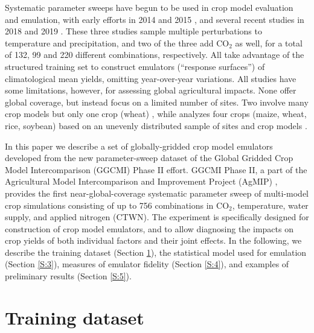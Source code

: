 \documentclass[gmd, manuscript]{copernicus} %
\begin{document}
Systematic parameter sweeps have begun to be used in crop model evaluation and emulation, with early efforts in 2014 and 2015 \citep{ruane2014, Markowski2015, Pirttioja2015}, and several recent studies in 2018 and 2019 \citep{FRONZEK20182, Snyder2018, RUIZRAMOS2018}. 
These three studies sample multiple perturbations to temperature and precipitation, and two of the three add CO$_2$ as well, for a total of 132, 99 and 220 different combinations, respectively. 
All take advantage of the structured training set to construct emulators (``response surfaces'') of climatological mean yields, omitting year-over-year variations. 
All studies have some limitations, however, for assessing global agricultural impacts. None offer global coverage, but instead focus on a limited number of sites. Two involve many crop models but only one crop (wheat) \citep{FRONZEK20182,RUIZRAMOS2018}, while \citet{Snyder2018} analyzes four crops (maize, wheat, rice, soybean) based on an unevenly distributed sample of sites and crop models \citep{mcdermid2015agmip}.

In this paper we describe a set of globally-gridded crop model emulators developed from the new parameter-sweep dataset of the Global Gridded Crop Model Intercomparison (GGCMI) Phase II effort. 
GGCMI Phase II, a part of the Agricultural Model Intercomparison and Improvement Project (AgMIP) \citep{ROSENZWEIG2013, Rosenzweig2014}, provides the first near-global-coverage systematic parameter sweep of multi-model crop simulations consisting of up to 756 combinations in CO$_2$, temperature, water supply, and applied nitrogen (CTWN). %
The experiment is specifically designed for construction of crop model emulators, and to allow diagnosing the impacts on crop yields of both individual factors and their joint effects.
In the following, we describe the training dataset (Section \ref{S:2}), the statistical model used for emulation (Section \ref{S:3}), measures of emulator fidelity (Section \ref{S:4}), and examples of preliminary results (Section \ref{S:5}). 

\section{Training dataset}
\label{S:2}
\end{document}
